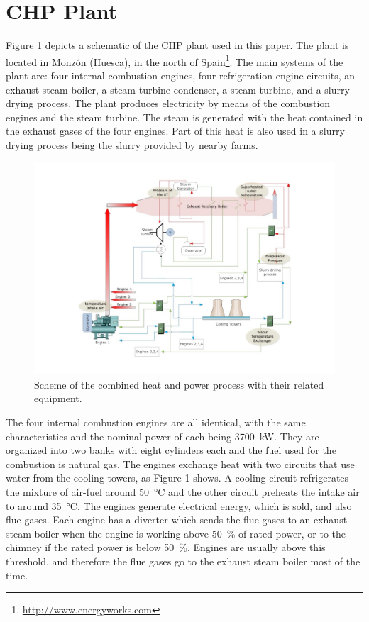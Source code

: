 \section{CHP Plant}
\label{plant}

Figure \ref{figplant} depicts a schematic of the CHP plant used in this paper. The plant is located in Monz\'on (Huesca), in the north of Spain\footnote{\url{http://www.energyworks.com}}. The main systems of the plant are: four internal combustion engines, four refrigeration engine circuits, an exhaust steam boiler, a steam turbine condenser, a steam turbine, and a slurry drying process. The plant produces electricity by means of the combustion engines and the steam turbine. The steam is generated with the heat contained in the exhaust gases of the four engines. Part of this heat is also used in a slurry drying process being the slurry provided by nearby farms.

\begin{figure}
\includegraphics[width=1\textwidth]{figures/plant.pdf}
\caption{Scheme of the combined heat and power process with their related equipment.}
\label{figplant}
\end{figure}

The four internal combustion engines are all identical, with the same characteristics and the nominal power of each being \SI{3700}{kW}. They are organized into two banks with eight cylinders each and the fuel used for the combustion is natural gas. The engines exchange heat with two circuits that use water from the cooling towers, as Figure 1 shows. A cooling circuit refrigerates the mixture of air-fuel around \SI{50}{\celsius} and the other circuit preheats the intake air to around \SI{35}{\celsius}. The engines generate electrical energy, which is sold,  and also flue gases. Each engine has a diverter which sends the flue gases to an exhaust steam boiler when the engine is working above \SI{50}{\percent} of rated power, or to the chimney if the rated power is below \SI{50}{\percent}. Engines are usually above this threshold, and therefore the flue gases go to the exhaust steam boiler most of the time. 

